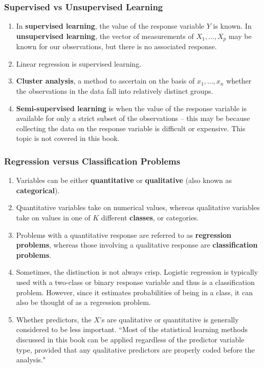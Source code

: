 \documentclass[10pt]{article}
\begin{document}
\subsubsection{Supervised vs Unsupervised Learning} 	

\begin{enumerate}
	\item In \textbf{supervised learning}, the value of the response variable $Y$ is known.  In \textbf{unsupervised learning}, the vector of measurements of $X_1, ..., X_p$ may be known for our observations, but there is no associated response.
	\item Linear regression is supervised learning.
	\item \textbf{Cluster analysis}, a method to ascertain on the basis of $x_1, ..., x_n$ whether the observations in the data fall into relatively distinct groups.
	\item \textbf{Semi-supervised learning} is when the value of the response variable is available for only a strict subset of the observations -- this may be because collecting the data on the response variable is difficult or expensive.  This topic is not covered in this book. 
\end{enumerate}	

\subsubsection{Regression versus Classification Problems} 
\begin{enumerate}
	\item Variables can be either \textbf{quantitative} or \textbf{qualitative} (also known as \textbf{categorical}).
	\item Quantitative variables take on numerical values, whereas qualitative variables take on values in one of $K$ different \textbf{classes}, or categories.
	\item Problems with a quantitative response are referred to as \textbf{regression problems}, whereas those involving a qualitative response are \textbf{classification problems}. 
	\item Sometimes, the distinction is not always crisp.  Logistic regression is typically used with a two-class or binary response variable and thus is a classification problem.  However, since it estimates probabilities of being in a class, it can also be thought of as a regression problem.
	\item Whether predictors, the $X$'s are qualitative or quantitative is generally considered to be less important.  ``Most of the statistical learning methods discussed in this book can be applied regardless of the predictor variable type, provided that any qualitative predictors are properly coded before the analysis."
\end{enumerate}
\end{document}
